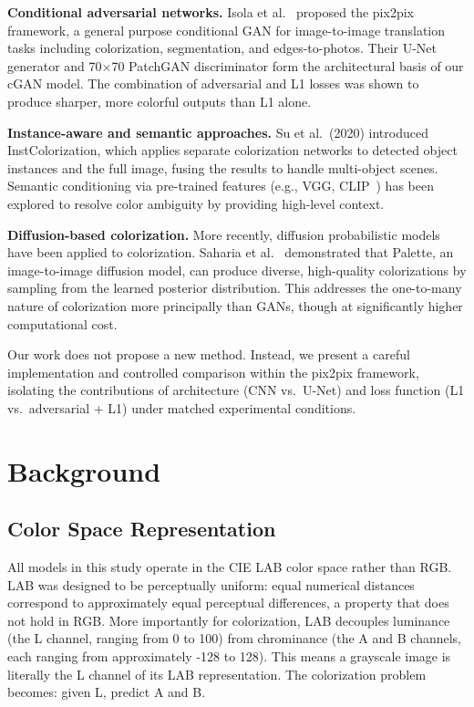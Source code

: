 \documentclass[11pt,a4paper]{article}
\begin{document}
\textbf{Conditional adversarial networks.}
Isola et al.~\cite{isola2017pix2pix} proposed the pix2pix framework, a general
purpose conditional GAN for image-to-image translation tasks including
colorization, segmentation, and edges-to-photos. Their U-Net generator and
70$\times$70 PatchGAN discriminator form the architectural basis of our cGAN
model. The combination of adversarial and L1 losses was shown to produce sharper,
more colorful outputs than L1 alone.

\textbf{Instance-aware and semantic approaches.}
Su et al.~(2020) introduced InstColorization, which applies separate
colorization networks to detected object instances and the full image,
fusing the results to handle multi-object scenes. Semantic conditioning via
pre-trained features (e.g., VGG, CLIP~\cite{radford2021clip}) has been explored
to resolve color ambiguity by providing high-level context.

\textbf{Diffusion-based colorization.}
More recently, diffusion probabilistic models have been applied to
colorization. Saharia et al.~\cite{saharia2022palette} demonstrated that
Palette, an image-to-image diffusion model, can produce diverse, high-quality
colorizations by sampling from the learned posterior distribution. This
addresses the one-to-many nature of colorization more principally than GANs,
though at significantly higher computational cost.

Our work does not propose a new method. Instead, we present a careful
implementation and controlled comparison within the pix2pix framework,
isolating the contributions of architecture (CNN vs.\ U-Net) and loss function
(L1 vs.\ adversarial + L1) under matched experimental conditions.

\section{Background}

\subsection{Color Space Representation}

All models in this study operate in the CIE LAB color space rather than RGB.
LAB was designed to be perceptually uniform: equal numerical distances correspond
to approximately equal perceptual differences, a property that does not hold in
RGB. More importantly for colorization, LAB decouples luminance (the L channel,
ranging from 0 to 100) from chrominance (the A and B channels, each ranging from
approximately -128 to 128). This means a grayscale image is literally the L
channel of its LAB representation. The colorization problem becomes: given L,
predict A and B.
\end{document}
